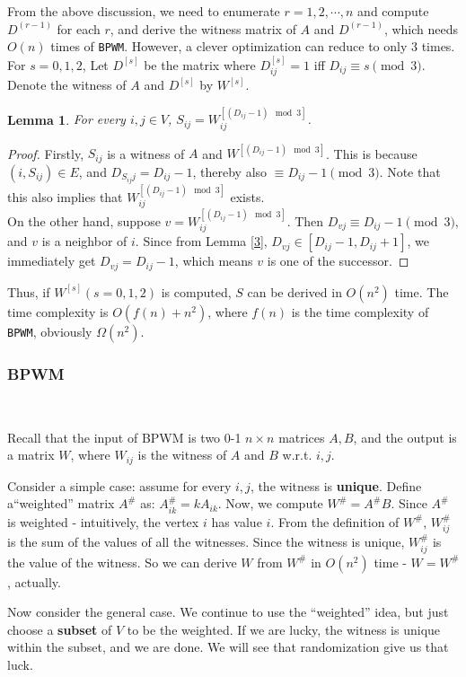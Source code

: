 \documentclass[12pt]{article}
\newtheorem{lemma}{Lemma}
\begin{document}
From the above discussion, we need to enumerate $r=1,2,\cdots,n$ and compute $D^{(r-1)}$ for each $r$, and derive the witness matrix of $A$ and $D^{(r-1)}$, which needs $O(n)$ times of \texttt{BPWM}. However, a clever optimization can reduce to only $3$ times. For $s=0,1,2$, Let $D^{[s]}$ be the matrix where $D^{[s]}_{ij}=1$ iff $D_{ij}\equiv s\pmod 3$. Denote the witness of $A$ and $D^{[s]}$ by $W^{[s]}$.

\begin{lemma}
\label{5}
For every $i,j\in V$, $S_{ij}=W^{[(D_{ij}-1)\mod 3]}_{ij}$.
\end{lemma}
\begin{proof}
Firstly, $S_{ij}$ is a witness of $A$ and $W^{[(D_{ij}-1)\mod 3]}$. This is because $(i,S_{ij})\in E$, and $D_{S_{ij}j}=D_{ij}-1$, thereby also $\equiv D_{ij}-1\pmod 3$. Note that this also implies that $W^{[(D_{ij}-1)\mod 3]}_{ij}$ exists.\\
On the other hand, suppose $v=W^{[(D_{ij}-1)\mod 3]}_{ij}$. Then $D_{vj}\equiv D_{ij}-1\pmod 3$, and $v$ is a neighbor of $i$. Since from Lemma \ref{3}, $D_{vj}\in [D_{ij}-1,D_{ij}+1]$, we immediately get $D_{vj}=D_{ij}-1$, which means $v$ is one of the successor.
\end{proof}

Thus, if $W^{[s]}(s=0,1,2)$ is computed, $S$ can be derived in $O(n^2)$ time. The time complexity is $O(f(n)+n^2)$, where $f(n)$ is the time complexity of \texttt{BPWM}, obviously $\Omega(n^2)$.

\subsubsection{BPWM}
\label{sec:bpwm}\

Recall that the input of BPWM is two 0-1 $n\times n$ matrices $A,B$, and the output is a matrix $W$, where $W_{ij}$ is the witness of $A$ and $B$ w.r.t. $i,j$.

Consider a simple case: assume for every $i,j$, the witness is \textbf{unique}. Define a``weighted'' matrix $A^{\#}$ as: $A^{\#}_{ik}=kA_{ik}$. Now, we compute $W^{\#}=A^{\#}B$. Since $A^{\#}$ is weighted - intuitively, the vertex $i$ has value $i$. From the definition of $W^{\#}$, $W^{\#}_{ij}$ is the sum of the values of all the witnesses. Since the witness is unique, $W^{\#}_{ij}$ is the value of the witness. So we can derive $W$ from $W^{\#}$ in $O(n^2)$ time - $W=W^{\#}$, actually.

Now consider the general case. We continue to use the ``weighted'' idea, but just choose a \textbf{subset} of $V$ to be the weighted. If we are lucky, the witness is unique within the subset, and we are done. We will see that randomization give us that luck.
\end{document}
